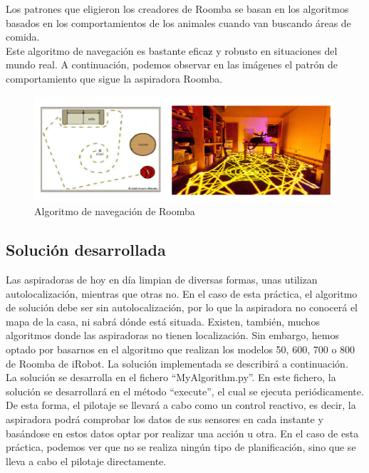 Los patrones que eligieron los creadores de Roomba se basan en los algoritmos basados en los comportamientos de los animales cuando van buscando áreas de comida.\\

Este algoritmo de navegación es bastante eficaz y robusto en situaciones del mundo real. A continuación, podemos observar en las imágenes el patrón de comportamiento que sigue la aspiradora Roomba.\\

\begin{figure}[H]
  \begin{center}
    \includegraphics[width=1\textwidth]{figures/Vacuum/Algoritmo_roomba.png}
		\caption{Algoritmo de navegación de Roomba}
		\label{fig.Algoritmo_roomba}
		\end{center}
\end{figure}

\subsection{Solución desarrollada}
Las aspiradoras de hoy en día limpian de diversas formas, unas utilizan autolocalización, mientras que otras no. En el caso de esta práctica, el algoritmo de solución debe ser sin autolocalización, por lo que la aspiradora no conocerá el mapa de la casa, ni sabrá dónde está situada. Existen, también, muchos algoritmos donde las aspiradoras no tienen localización. Sin embargo, hemos optado por basarnos en el algoritmo que realizan los modelos 50, 600, 700 o 800 de Roomba de iRobot. La solución implementada se describirá a continuación. \\

La solución se desarrolla en el fichero ``MyAlgorithm.py''. En este fichero, la solución se desarrollará en el método ``execute'', el cual se ejecuta periódicamente. De esta forma, el pilotaje se llevará a cabo como un control reactivo, es decir, la aspiradora podrá comprobar los datos de sus sensores en cada instante y basándose en estos datos optar por realizar una acción u otra. En el caso de esta práctica, podemos ver que no se realiza ningún tipo de planificación, sino que se lleva a cabo el pilotaje directamente.\\

